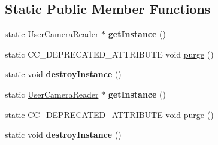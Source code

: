 \subsection*{Static Public Member Functions}
\begin{DoxyCompactItemize}
\item 
\mbox{\label{classcocostudio_1_1UserCameraReader_ac53d6fdef6502afac48c1a780fdc7c7d}} 
static \hyperlink{classcocostudio_1_1UserCameraReader}{User\+Camera\+Reader} $\ast$ {\bfseries get\+Instance} ()
\item 
static C\+C\+\_\+\+D\+E\+P\+R\+E\+C\+A\+T\+E\+D\+\_\+\+A\+T\+T\+R\+I\+B\+U\+TE void \hyperlink{classcocostudio_1_1UserCameraReader_a2af0072ffc30972ccb8172d9f9858fab}{purge} ()
\item 
\mbox{\label{classcocostudio_1_1UserCameraReader_a8b8ad62682941bbd372141576b454f88}} 
static void {\bfseries destroy\+Instance} ()
\item 
\mbox{\label{classcocostudio_1_1UserCameraReader_a5ea41769a41ac66f366a7aef52fd90ed}} 
static \hyperlink{classcocostudio_1_1UserCameraReader}{User\+Camera\+Reader} $\ast$ {\bfseries get\+Instance} ()
\item 
static C\+C\+\_\+\+D\+E\+P\+R\+E\+C\+A\+T\+E\+D\+\_\+\+A\+T\+T\+R\+I\+B\+U\+TE void \hyperlink{classcocostudio_1_1UserCameraReader_a251a6f212c3a95d29378bf37af3a7bcf}{purge} ()
\item 
\mbox{\label{classcocostudio_1_1UserCameraReader_af5bbdaded0b7d67b5ec9efc093be9a41}} 
static void {\bfseries destroy\+Instance} ()
\end{DoxyCompactItemize}

